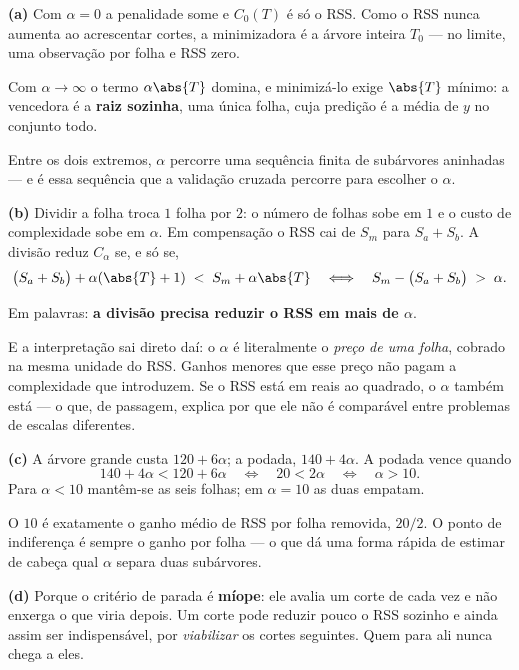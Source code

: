 \begin{solucao}
\textbf{(a)} Com $\alpha=0$ a penalidade some e $C_0(T)$ é só o RSS. Como o RSS
nunca aumenta ao acrescentar cortes, a minimizadora é a árvore inteira $T_0$ ---
no limite, uma observação por folha e RSS zero.

Com $\alpha\to\infty$ o termo $\alpha\abs{T}$ domina, e minimizá-lo exige
$\abs{T}$ mínimo: a vencedora é a \textbf{raiz sozinha}, uma única folha, cuja
predição é a média de $y$ no conjunto todo.

Entre os dois extremos, $\alpha$ percorre uma sequência finita de subárvores
aninhadas --- e é essa sequência que a validação cruzada percorre para escolher o
$\alpha$.

\smallskip
\textbf{(b)} Dividir a folha troca $1$ folha por $2$: o número de folhas sobe em
$1$ e o custo de complexidade sobe em $\alpha$. Em compensação o RSS cai de $S_m$
para $S_a+S_b$. A divisão reduz $C_\alpha$ se, e só se,
\[
  \big(S_a+S_b\big) + \alpha(\abs{T}+1)
  \;<\; S_m + \alpha\abs{T}
  \quad\Longleftrightarrow\quad
  S_m-\big(S_a+S_b\big) \;>\; \alpha .
\]

Em palavras: \textbf{a divisão precisa reduzir o RSS em mais de $\alpha$}.

E a interpretação sai direto daí: o $\alpha$ é literalmente o \emph{preço de uma
folha}, cobrado na mesma unidade do RSS. Ganhos menores que esse preço não pagam
a complexidade que introduzem. Se o RSS está em reais ao quadrado, o $\alpha$
também está --- o que, de passagem, explica por que ele não é comparável entre
problemas de escalas diferentes.

\smallskip
\textbf{(c)} A árvore grande custa $120+6\alpha$; a podada, $140+4\alpha$. A
podada vence quando
\[
  140+4\alpha < 120+6\alpha
  \quad\Longleftrightarrow\quad
  20 < 2\alpha
  \quad\Longleftrightarrow\quad
  \boxed{\alpha > 10}.
\]
Para $\alpha<10$ mantêm-se as seis folhas; em $\alpha=10$ as duas empatam.

O $10$ é exatamente o ganho médio de RSS por folha removida, $20/2$. O
ponto de indiferença é sempre o ganho por folha --- o que dá uma forma rápida de
estimar de cabeça qual $\alpha$ separa duas subárvores.

\smallskip
\textbf{(d)} Porque o critério de parada é \textbf{míope}: ele avalia um corte de
cada vez e não enxerga o que viria depois. Um corte pode reduzir pouco o RSS
sozinho e ainda assim ser indispensável, por \emph{viabilizar} os cortes
seguintes. Quem para ali nunca chega a eles.


\end{solucao}
